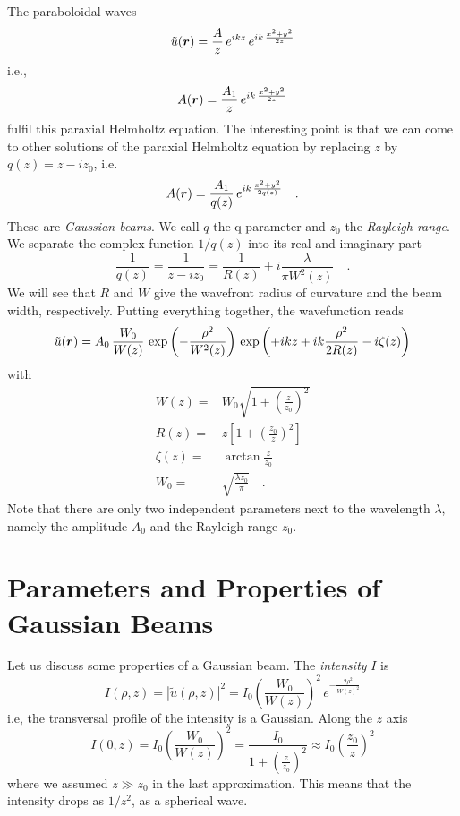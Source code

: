 The paraboloidal waves 
\begin{equation}
    \tilde{u}(\boldsymbol{r}) = \frac{A}{z} \, e^{i k z} \, e^{i k \, \frac{x^2 + y^2}{2z}  }
\end{equation}
i.e.,
\begin{equation}
    A(\boldsymbol{r}) = \frac{A_1}{z}  \, e^{i k \, \frac{x^2 + y^2}{2z}  }
\end{equation}
fulfil this paraxial Helmholtz equation. The interesting point is that we can come to other solutions of the paraxial Helmholtz equation by replacing $z$ by $q(z) = z - i z_0$, i.e.
\begin{equation}
    A(\boldsymbol{r}) = \frac{A_1}{q(z)}  \, e^{i k \, \frac{x^2 + y^2}{2q(z)}  } \quad .
\end{equation}
These are \emph{Gaussian beams}. We call $q$ the q-parameter and $z_0$ the \emph{Rayleigh range}. We separate the complex function $1/q(z)$ into its real and imaginary part
\begin{equation}
    \frac{1}{q(z)} = \frac{1}{z -i z_0} = \frac{1}{R(z)} + i \frac{\lambda}{\pi W^2(z)} \quad .
\end{equation}
We will see that $R$ and $W$ give the wavefront radius of curvature and the beam width, respectively. Putting everything together, the wavefunction reads
\begin{equation}
    \tilde{u}(\boldsymbol{r}) = A_0 \, \frac{W_0}{W(z)} \, 
    \exp \left( - \frac{\rho^2}{W^2(z)}  \right) \, 
    \exp \left( +i kz +ik  \frac{\rho^2}{2 R(z)}  - i \zeta(z) \right) 
\end{equation}
with
\begin{align}
    W(z) = & W_0 \sqrt{1 + \left( \frac{z}{z_0} \right)^2    } \label{eq:2_wz} \\
    R(z) = & z \left[ 1 + \left( \frac{z_0}{z} \right)^2 \right] \\
    \zeta(z) = & \arctan \frac{z}{z_0} \\
    W_0 = & \sqrt{\frac{\lambda z_0}{\pi}} \quad . \label{eq:2_w0}
\end{align}
Note that there are only two independent parameters next to the wavelength $\lambda$, namely the amplitude $A_0$ and the Rayleigh range $z_0$.



\section{Parameters and Properties of Gaussian Beams}

Let us discuss some properties of a Gaussian beam. The \emph{intensity} $I$ is
\begin{equation}
    I(\rho, z) = | \tilde{u}(\rho, z) |^2 = I_0 \left( \frac{W_0}{W(z)}  \right)^2 \, e^{- \frac{2 \rho^2}{W(z)^2} }
\end{equation}
i.e, the transversal profile of the intensity is a Gaussian. Along the $z$ axis
\begin{equation}
    I(0, z) =  I_0 \left( \frac{W_0}{W(z)} \right)^2= \frac{I_0}{1 + \left( \frac{z}{z_0} \right)^2}  \approx I_0  \left( \frac{z_0}{z} \right)^2
\end{equation}
where we assumed $z \gg z_0$ in the last approximation. This means that the intensity drops as $1/z^2$, as a spherical wave.


